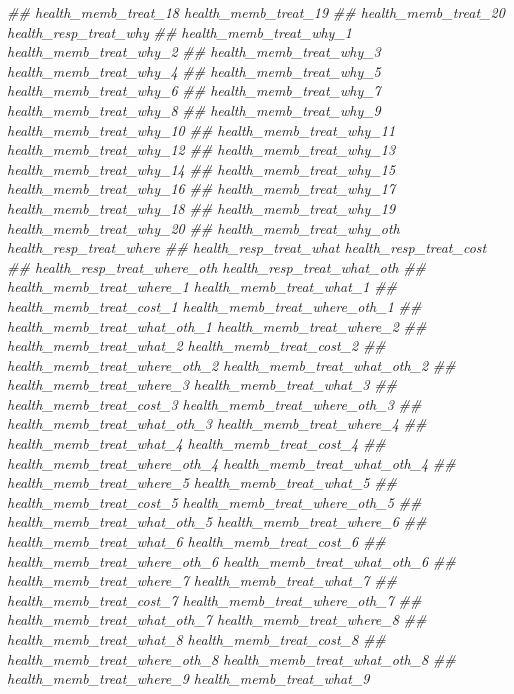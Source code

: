 \documentclass[
]{article}
\newenvironment{Shaded}{\begin{snugshade}}{\end{snugshade}}
\newcommand{\CommentTok}[1]{\textcolor[rgb]{0.56,0.35,0.01}{\textit{#1}}}
\begin{document}
\begin{Shaded}
\begin{Highlighting}[]
\CommentTok{##      health_memb_treat_18 health_memb_treat_19}
\CommentTok{##      health_memb_treat_20 health_resp_treat_why}
\CommentTok{##      health_memb_treat_why_1 health_memb_treat_why_2}
\CommentTok{##      health_memb_treat_why_3 health_memb_treat_why_4}
\CommentTok{##      health_memb_treat_why_5 health_memb_treat_why_6}
\CommentTok{##      health_memb_treat_why_7 health_memb_treat_why_8}
\CommentTok{##      health_memb_treat_why_9 health_memb_treat_why_10}
\CommentTok{##      health_memb_treat_why_11 health_memb_treat_why_12}
\CommentTok{##      health_memb_treat_why_13 health_memb_treat_why_14}
\CommentTok{##      health_memb_treat_why_15 health_memb_treat_why_16}
\CommentTok{##      health_memb_treat_why_17 health_memb_treat_why_18}
\CommentTok{##      health_memb_treat_why_19 health_memb_treat_why_20}
\CommentTok{##      health_memb_treat_why_oth health_resp_treat_where}
\CommentTok{##      health_resp_treat_what health_resp_treat_cost}
\CommentTok{##      health_resp_treat_where_oth health_resp_treat_what_oth}
\CommentTok{##      health_memb_treat_where_1 health_memb_treat_what_1}
\CommentTok{##      health_memb_treat_cost_1 health_memb_treat_where_oth_1}
\CommentTok{##      health_memb_treat_what_oth_1 health_memb_treat_where_2}
\CommentTok{##      health_memb_treat_what_2 health_memb_treat_cost_2}
\CommentTok{##      health_memb_treat_where_oth_2 health_memb_treat_what_oth_2}
\CommentTok{##      health_memb_treat_where_3 health_memb_treat_what_3}
\CommentTok{##      health_memb_treat_cost_3 health_memb_treat_where_oth_3}
\CommentTok{##      health_memb_treat_what_oth_3 health_memb_treat_where_4}
\CommentTok{##      health_memb_treat_what_4 health_memb_treat_cost_4}
\CommentTok{##      health_memb_treat_where_oth_4 health_memb_treat_what_oth_4}
\CommentTok{##      health_memb_treat_where_5 health_memb_treat_what_5}
\CommentTok{##      health_memb_treat_cost_5 health_memb_treat_where_oth_5}
\CommentTok{##      health_memb_treat_what_oth_5 health_memb_treat_where_6}
\CommentTok{##      health_memb_treat_what_6 health_memb_treat_cost_6}
\CommentTok{##      health_memb_treat_where_oth_6 health_memb_treat_what_oth_6}
\CommentTok{##      health_memb_treat_where_7 health_memb_treat_what_7}
\CommentTok{##      health_memb_treat_cost_7 health_memb_treat_where_oth_7}
\CommentTok{##      health_memb_treat_what_oth_7 health_memb_treat_where_8}
\CommentTok{##      health_memb_treat_what_8 health_memb_treat_cost_8}
\CommentTok{##      health_memb_treat_where_oth_8 health_memb_treat_what_oth_8}
\CommentTok{##      health_memb_treat_where_9 health_memb_treat_what_9}

\end{Highlighting}
\end{Shaded}
\end{document}
